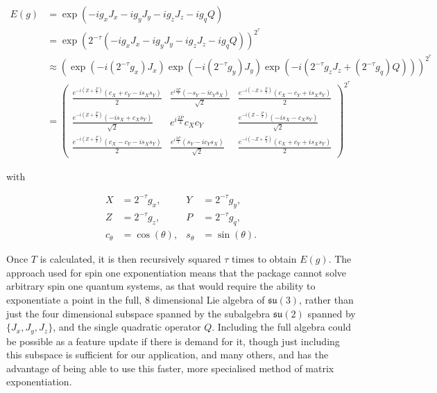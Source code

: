 \documentclass{jors}
\begin{document}
            \begin{align}
                E(g) &= \exp(-ig_x J_x - ig_y J_y - ig_z J_z - ig_q Q)\\
                &= \exp(2^{-\tau}(-ig_x J_x - ig_y J_y - ig_z J_z - ig_q Q))^{2^\tau}\\
                &\approx (\exp(-i(2^{-\tau} g_x) J_x) \exp(-i(2^{-\tau} g_y) J_y) \exp(-i(2^{-\tau} g_z J_z + (2^{-\tau} g_q) Q)))^{2^\tau}\\
                &= \begin{pmatrix}
                    \frac{e^{-i\left(Z + \frac{P}{3}\right)}(c_X + c_Y - i s_Xs_Y)}{2} & \frac{e^{i\frac{2P}{3}} (-s_Y -i c_Y s_X)}{\sqrt{2}} & \frac{e^{-i\left(-Z + \frac{P}{3}\right)}(c_X - c_Y + i s_Xs_Y)}{2} \\
                    \frac{e^{-i\left(Z + \frac{P}{3}\right)} (-i s_X + c_X s_Y)}{\sqrt{2}} & e^{i\frac{2P}{3}} c_X c_Y & \frac{e^{-i(Z - \frac{P}{3})} (-i s_X - c_X s_Y)}{\sqrt{2}} \\
                    \frac{e^{-i\left(Z + \frac{P}{3}\right)}(c_X - c_Y - i s_Xs_Y)}{2} & \frac{e^{i\frac{2P}{3}} (s_Y -i c_Y s_X)}{\sqrt{2}} & \frac{e^{-i\left(-Z + \frac{P}{3}\right)}(c_X + c_Y + i s_Xs_Y)}{2}
                \end{pmatrix}^{2^\tau}
            \end{align}

			with

            \begin{align}
                X &= 2^{-\tau}g_x,&
                Y &= 2^{-\tau}g_y,\nonumber\\
                Z &= 2^{-\tau}g_z,&
                P &= 2^{-\tau}g_q,\nonumber\\
                c_{\theta} &= \cos(\theta),&
                s_{\theta} &= \sin(\theta).
            \end{align}
        
			Once \(T\) is calculated, it is then recursively squared \(\tau\) times to obtain \(E(g)\). The approach used for spin one exponentiation means that the package cannot solve arbitrary spin one quantum systems, as that would require the ability to exponentiate a point in the full, 8 dimensional Lie algebra of \(\mathfrak{su}(3)\), rather than just the four dimensional subspace spanned by the subalgebra \(\mathfrak{su}(2)\) spanned by \(\{J_x, J_y, J_z\}\), and the single quadratic operator \(Q\). Including the full algebra could be possible as a feature update if there is demand for it, though just including this subspace is sufficient for our application, and many others, and has the advantage of being able to use this faster, more specialised method of matrix exponentiation.
\end{document}

